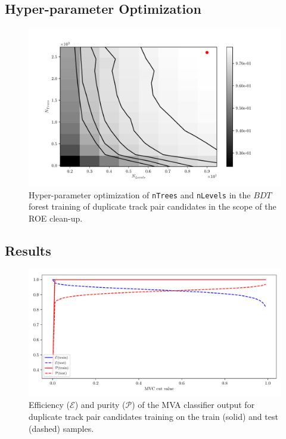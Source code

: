 \subsection{Hyper-parameter Optimization}

\begin{figure}[H]
\centering
\captionsetup{width=0.8\linewidth}
\includegraphics[width=\linewidth]{fig/addendums/dup_hpo}
\caption{Hyper-parameter optimization of \texttt{\footnotesize nTrees} and \texttt{\footnotesize nLevels} in the $BDT$ forest training of duplicate track pair candidates in the scope of the ROE clean-up.}
\end{figure}

\subsection{Results}

\begin{figure}[H]
\centering
\captionsetup{width=0.8\linewidth}
\includegraphics[width=\linewidth]{fig/addendums/dup_effpur}
\caption{Efficiency ($\mathcal{E}$) and purity ($\mathcal{P}$) of the MVA classifier output for duplicate track pair candidates training on the train (solid) and test (dashed) samples.}
\end{figure}

